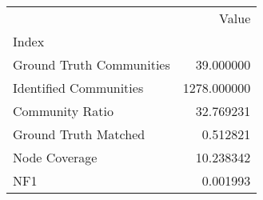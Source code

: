 \begin{tabular}{lr}
\toprule
{} &        Value \\
Index                    &              \\
\midrule
Ground Truth Communities &    39.000000 \\
Identified Communities   &  1278.000000 \\
Community Ratio          &    32.769231 \\
Ground Truth Matched     &     0.512821 \\
Node Coverage            &    10.238342 \\
NF1                      &     0.001993 \\
\bottomrule
\end{tabular}
